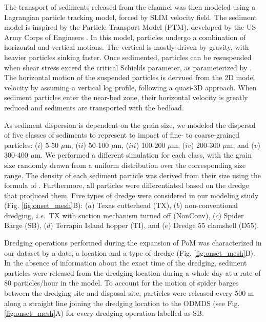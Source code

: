 \documentclass[preprint,12pt,authoryear]{elsarticle}
\newcommand{\ie}{{\it i.e.}\ }
\begin{document}
The transport of sediments released from the channel was then modeled using a Lagrangian particle tracking model, forced by SLIM velocity field. The sediment model is inspired by the Particle Transport Model (PTM), developed by the US Army Corps of Engineers \citep{macdonald2006ptm}. In this model, particles undergo a combination of horizontal and vertical motions. The vertical is mostly driven by gravity, with heavier particles sinking faster. Once sedimented, particles can be resuspended when shear stress exceed the critical Schields parameter, as parameterized by \cite{soulsby1997threshold}. The horizontal motion of the suspended particles is dervued from the 2D model velocity by assuming a vertical log profile, following a quasi-3D approach. When sediment particles enter the near-bed zone, their horizontal velocity is greatly reduced and sediments are transported with the bedload.

As sediment dispersion is dependent on the grain size, we modeled the dispersal of five classes of sediments to represent to impact of fine- to coarse-grained particles: ($i$) 5-50 $\mu$m, ($ii$) 50-100 $\mu$m, ($iii$) 100-200 $\mu$m, ($iv$) 200-300 $\mu$m, and ($v$) 300-400 $\mu$m. We performed a  different simulation for each class, with the grain size randomly drawn from a uniform distribution over the corresponding size range. The density of each sediment particle was derived from their size using the formula of \cite{hamilton1982sound}. Furthermore, all particles were differentiated based on the dredge that produced them. Five types of dredge were considered in our modeling study (Fig. \ref{fig:onset_mesh}B): ($a$) Texas cutterhead (TX), ($b$) non-conventional dredging, \ie TX with suction mechanism turned off (NonConv), ($c$) Spider Barge (SB), ($d$) Terrapin Island hopper (TI), and ($e$) Dredge 55 clamshell (D55).

Dredging operations performed during the expansion of PoM was characterized in our dataset by a date, a location and  a type of dredge (Fig. \ref{fig:onset_mesh}B). In the absence of information about the exact time of the dredging, sediment particles were released from the dredging location during a whole day at a rate of 80 particles/hour in the model. To account for the motion of spider barges between the dredging site and disposal site, particles were released every 500 m along a straight line joining the dredging location to the ODMDS (see Fig. \ref{fig:onset_mesh}A) for every dredging operation labelled as SB.
\end{document}
